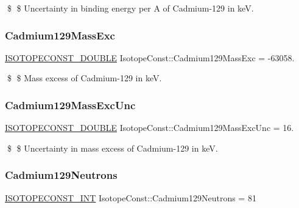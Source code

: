 \$ \$ Uncertainty in binding energy per A of Cadmium-\/129 in keV. \mbox{\label{group___isotope_const-_cadmium-_cd129_ga0a46aa689730229ee99310161325f0b3}} 
\subsubsection{\texorpdfstring{Cadmium129\+Mass\+Exc}{Cadmium129MassExc}}
{\footnotesize\ttfamily \mbox{\hyperlink{group___isotope_const-_macros_ga8f45a7272ce02c0b4c65c44636ed719a}{I\+S\+O\+T\+O\+P\+E\+C\+O\+N\+S\+T\+\_\+\+D\+O\+U\+B\+LE}} Isotope\+Const\+::\+Cadmium129\+Mass\+Exc = -\/63058.}

\$ \$ Mass excess of Cadmium-\/129 in keV. \mbox{\label{group___isotope_const-_cadmium-_cd129_ga4bbb2ecd1838ed3fcf62742dd9b0d2bd}} 
\subsubsection{\texorpdfstring{Cadmium129\+Mass\+Exc\+Unc}{Cadmium129MassExcUnc}}
{\footnotesize\ttfamily \mbox{\hyperlink{group___isotope_const-_macros_ga8f45a7272ce02c0b4c65c44636ed719a}{I\+S\+O\+T\+O\+P\+E\+C\+O\+N\+S\+T\+\_\+\+D\+O\+U\+B\+LE}} Isotope\+Const\+::\+Cadmium129\+Mass\+Exc\+Unc = 16.}

\$ \$ Uncertainty in mass excess of Cadmium-\/129 in keV. \mbox{\label{group___isotope_const-_cadmium-_cd129_ga7a37df0769302b018f262e83f673bb95}} 
\subsubsection{\texorpdfstring{Cadmium129\+Neutrons}{Cadmium129Neutrons}}
{\footnotesize\ttfamily \mbox{\hyperlink{group___isotope_const-_macros_ga5f18360b3e99483a35c32d789e62621c}{I\+S\+O\+T\+O\+P\+E\+C\+O\+N\+S\+T\+\_\+\+I\+NT}} Isotope\+Const\+::\+Cadmium129\+Neutrons = 81}

